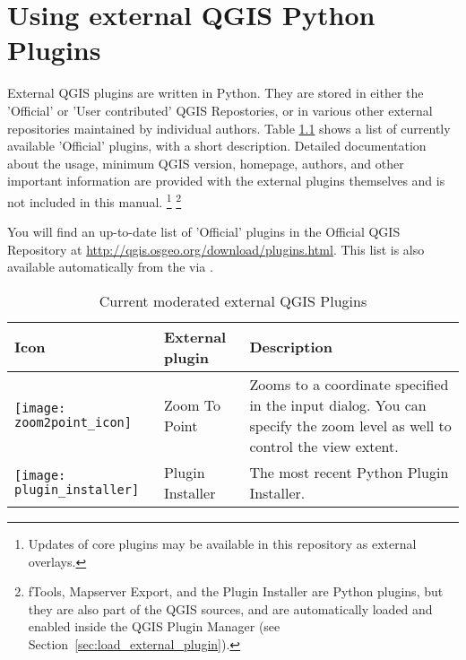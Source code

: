 
\chapter{Using external QGIS Python Plugins}\label{sec:external_plugins}


External QGIS plugins are written in Python. They are stored in either 
the 'Official' or 'User contributed' QGIS Repostories, or in various other external 
repositories maintained by individual authors. 
Table \ref{tab:external_plugins} shows a list of currently available 'Official' 
plugins, with a short description.
Detailed documentation about the usage, minimum QGIS version, homepage, authors, 
and other important information are provided with the external plugins themselves 
and is not included in this manual.
\footnote{Updates of core plugins may be 
available in this repository as external overlays.} 
\footnote{fTools, Mapserver Export, and the Plugin Installer are Python plugins, 
but they are also part of the QGIS sources, and are automatically loaded and 
enabled inside the QGIS Plugin Manager (see Section~\ref{sec:load_external_plugin}).}

You will find an up-to-date list of 'Official' plugins in the Official QGIS 
Repository at \url{http://qgis.osgeo.org/download/plugins.html}. This list is 
also available automatically from the  
via .

\begin{table}[H]
\centering
\caption{Current moderated external QGIS Plugins}\label{tab:external_plugins}\medskip
\small
 \begin{tabular}{|l|l|p{4in}|}
\hline \textbf{Icon} & \textbf{External plugin} & \textbf{Description}\\
\hline
\texttt{[image: zoom2point\_icon]}
 & Zoom To Point \index{plugins!Zoom To Point} & Zooms to a coordinate 
  specified in the input dialog. You can specify the zoom level as well to 
  control the view extent.\\
\hline
\texttt{[image: plugin\_installer]}
 & Plugin Installer \index{plugins!Plugin Installer} & The most recent Python Plugin Installer.\\
\hline
\end{tabular}
\end{table}

